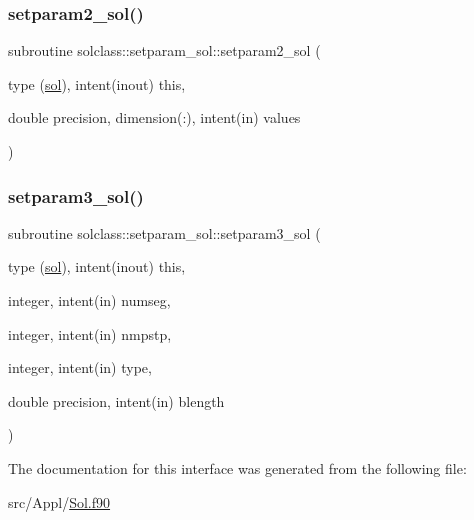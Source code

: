\mbox{\label{interfacesolclass_1_1setparam__sol_a0ca3b6bae895dd059d3170e25aaf4dd6}} 
\subsubsection{\texorpdfstring{setparam2\_sol()}{setparam2\_sol()}}
{\footnotesize\ttfamily subroutine solclass\+::setparam\+\_\+sol\+::setparam2\+\_\+sol (\begin{DoxyParamCaption}\item[{type (\mbox{\hyperlink{namespacesolclass_structsolclass_1_1sol}{sol}}), intent(inout)}]{this,  }\item[{double precision, dimension(\+:), intent(in)}]{values }\end{DoxyParamCaption})}

\mbox{\label{interfacesolclass_1_1setparam__sol_a6cd6341dc6fd8b5597bd302a1eef4590}} 
\subsubsection{\texorpdfstring{setparam3\_sol()}{setparam3\_sol()}}
{\footnotesize\ttfamily subroutine solclass\+::setparam\+\_\+sol\+::setparam3\+\_\+sol (\begin{DoxyParamCaption}\item[{type (\mbox{\hyperlink{namespacesolclass_structsolclass_1_1sol}{sol}}), intent(inout)}]{this,  }\item[{integer, intent(in)}]{numseg,  }\item[{integer, intent(in)}]{nmpstp,  }\item[{integer, intent(in)}]{type,  }\item[{double precision, intent(in)}]{blength }\end{DoxyParamCaption})}



The documentation for this interface was generated from the following file\+:\begin{DoxyCompactItemize}
\item 
src/\+Appl/\mbox{\hyperlink{_sol_8f90}{Sol.\+f90}}\end{DoxyCompactItemize}
